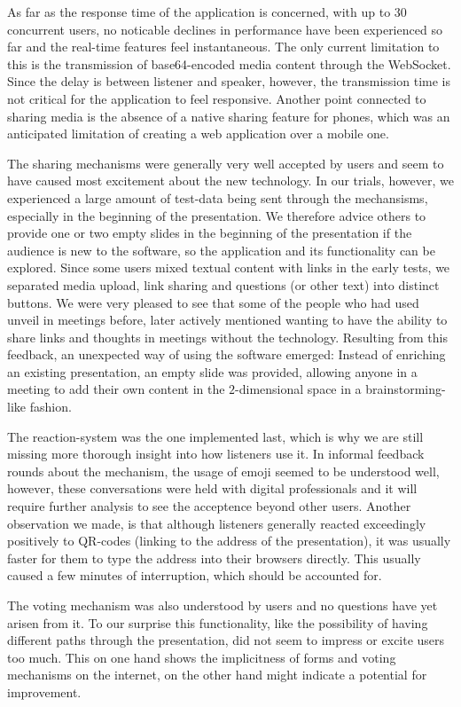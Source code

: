 As far as the response time of the application is concerned, with up to 30 concurrent users, no noticable declines in performance have been experienced so far and the real-time features feel instantaneous. The only current limitation to this is the transmission of base64-encoded media content through the WebSocket. Since the delay is between listener and speaker, however, the transmission time is not critical for the application to feel responsive. Another point connected to sharing media is the absence of a native sharing feature for phones, which was an anticipated limitation of creating a web application over a mobile one.

The sharing mechanisms were generally very well accepted by users and seem to have caused most excitement about the new technology. In our trials, however, we experienced a large amount of test-data being sent through the mechansisms, especially in the beginning of the presentation. We therefore advice others to provide one or two empty slides in the beginning of the presentation if the audience is new to the software, so the application and its functionality can be explored. Since some users mixed textual content with links in the early tests, we separated media upload, link sharing and questions (or other text) into distinct buttons. We were very pleased to see that some of the people who had used unveil in meetings before, later actively mentioned wanting to have the ability to share links and thoughts in meetings without the technology. Resulting from this feedback, an unexpected way of using the software emerged: Instead of enriching an existing presentation, an empty slide was provided, allowing anyone in a meeting to add their own content in the $2$-dimensional space in a brainstorming-like fashion.

The reaction-system was the one implemented last, which is why we are still missing more thorough insight into how listeners use it. In informal feedback rounds about the mechanism, the usage of emoji seemed to be understood well, however, these conversations were held with digital professionals and it will require further analysis to see the acceptence beyond other users. Another observation we made, is that although listeners generally reacted exceedingly positively to QR-codes (linking to the address of the presentation), it was usually faster for them to type the address into their browsers directly. This usually caused a few minutes of interruption, which should be accounted for.

The voting mechanism was also understood by users and no questions have yet arisen from it. To our surprise this functionality, like the possibility of having different paths through the presentation, did not seem to impress or excite users too much. This on one hand shows the implicitness of forms and voting mechanisms on the internet, on the other hand might indicate a potential for improvement.


